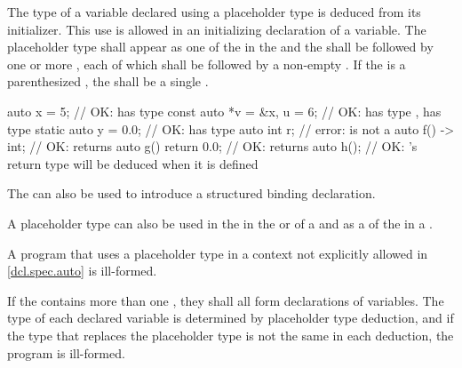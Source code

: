 \pnum
The type of a variable declared using a placeholder type is
deduced from its initializer.
This use is allowed
in an initializing declaration of a variable.
The placeholder type shall appear as one of the
 in the
 and the
shall be followed by one or more
,
each of which shall
be followed by a non-empty
.
If the  is a parenthesized ,
the  shall be a single .
\begin{example}
\begin{codeblock}
auto x = 5;                     // OK:  has type 
const auto *v = &x, u = 6;      // OK:  has type ,  has type 
static auto y = 0.0;            // OK:  has type 
auto int r;                     // error:  is not a 
auto f() -> int;                // OK:  returns 
auto g() { return 0.0; }        // OK:  returns 
auto h();                       // OK: 's return type will be deduced when it is defined
\end{codeblock}
\end{example}
The  
can also be used to introduce
a structured binding declaration.

\pnum
A placeholder type can also be used
in the  in
the  or  of a
and as a 
of the 
in a .

\pnum
A program that uses a placeholder type in a context not
explicitly allowed in \ref{dcl.spec.auto} is ill-formed.

\pnum
If the  contains more than one
, they shall all form declarations of
variables. The type of each declared variable is determined
by placeholder type deduction,
and if the type that replaces the placeholder type is not the
same in each deduction, the program is ill-formed.

